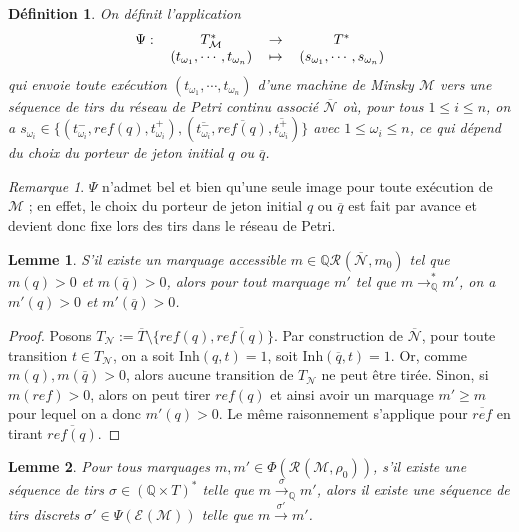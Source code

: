 \documentclass{article}
\newtheorem{definition}{Définition}
\newtheorem{lemma}{Lemme}
\theoremstyle{remark}
\newtheorem*{remark}{Remarque}
\theoremstyle{remark}
\newcommand{\reach}[3][]{\mathcal{R}^{#1}(\mathcal{#2}, #3)}
\newcommand{\creach}[3][]{\mathbb{Q}\reach[#1]{#2}{#3}}
\newcommand{\reaches}[1][]{\xrightarrow{#1}}
\newcommand{\creaches}[1][]{\reaches[#1]_{\mathbb{Q}}}
\newcommand{\creachess}{\creaches^*}
\newcommand{\function}[5]{
    \begin{tabular}{r c c c}
         $#1 :$ & $#2$ & $\rightarrow$ & $#3$ \\
                & $#4$ &   $\mapsto$   & $#5$
    \end{tabular}
}
\newcommand{\runs}[2][]{\mathcal{E}^{#1}(\mathcal{#2})}
\newcommand{\inhibitor}{\mathrm{Inh}}
\begin{document}
\begin{definition}
    On définit l'application \[
        \function{\Psi}{T_{\mathcal{M}}^*}{T^*}{(t_{\omega_1},\cdots,t_{\omega_n})}{(s_{\omega_1},\cdots,s_{\omega_n})}
    \]
    qui envoie toute exécution $(t_{\omega_1}, \cdots, t_{\omega_n})$ d'une machine de Minsky $\mathcal{M}$ vers une séquence de tirs du réseau de Petri continu associé $\overline{\mathcal{N}}$ où, pour tous $1 \leq i \leq n$, on a $s_{\omega_i} \in \{(t_{\omega_i}^-, ref(q), t_{\omega_i}^+), (\overline{t_{\omega_i}^-}, \overline{ref(q)}, \overline{t_{\omega_i}^+})\}$ avec $1 \leq \omega_i \leq n$, ce qui dépend du choix du porteur de jeton initial $q$ ou $\overline{q}$.
\end{definition}

\begin{remark}
    $\Psi$ n'admet bel et bien qu'une seule image pour toute exécution de $\mathcal{M}$ ; en effet, le choix du porteur de jeton initial $q$ ou $\overline{q}$ est fait par avance et devient donc fixe lors des tirs dans le réseau de Petri.
\end{remark}

\begin{lemma}
    \label{lemma:rational-lock}
    S'il existe un marquage accessible $m \in \creach{\overline{N}}{m_0}$ tel que $m(q) > 0$ et $m(\overline{q}) > 0$, alors pour tout marquage $m'$ tel que $m \creachess m'$, on a $m'(q) > 0$ et $m'(\overline{q}) > 0$.
\end{lemma}

\begin{proof}
    Posons $T_{\mathcal{N}} := \overline{T} \setminus \{ref(q), \overline{ref(q)}\}$. Par construction de $\overline{\mathcal{N}}$, pour toute transition $t \in T_{\mathcal{N}}$, on a soit $\inhibitor(q, t) = 1$, soit $\inhibitor(\overline{q}, t) = 1$. Or, comme $m(q), m(\overline{q}) > 0$, alors aucune transition de $T_{\mathcal{N}}$ ne peut être tirée. Sinon, si $m(ref) > 0$, alors on peut tirer $ref(q)$ et ainsi avoir un marquage $m' \geq m$ pour lequel on a donc $m'(q) > 0$. Le même raisonnement s'applique pour $\overline{ref}$ en tirant $\overline{ref(q)}$.
\end{proof}

\begin{lemma}
    \label{lemma:continuous-to-discrete-sequence}
    Pour tous marquages $m, m' \in \Phi(\reach{M}{\rho_0})$, s'il existe une séquence de tirs $\sigma \in (\mathbb{Q} \times T)^*$ telle que $m \creaches[\sigma] m'$, alors il existe une séquence de tirs discrets $\sigma' \in \Psi(\runs{\mathcal{M}})$ telle que $m \reaches[\sigma'] m'$.
\end{lemma}
\end{document}
